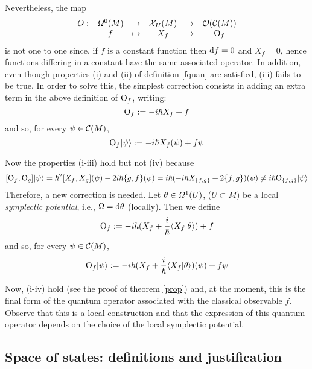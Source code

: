 \documentclass[12pt]{article}
\theoremstyle{plain}
\def\beq{\begin{equation}}
\def\eeq{\end{equation}}
\def\d{{\rm d}}
\def\C{{\cal C}}
\def\sta{|\psi \rangle }
\def\Op{{\rm O}}
\begin{document}
Nevertheless, the map
$$
\begin{array}{cccccc}
O:&{\mit\Omega}^0 (M)&\to &{\cal X}_H(M)&\to &{\cal O}(\C (M))
\\
&f& \mapsto &X_f& \mapsto &\Op_f
\end{array}
$$
is not one to one since,
if $f$ is a constant function
then $\d f = 0$ and $X_f=0$,
hence functions differing in a constant
have the same associated operator.
In addition, even though properties (i) and (ii) of definition
\ref{fquan}
are satisfied, (iii) fails to be true.
In order to solve this,
the simplest correction consists in adding
an extra term in the above definition of
$\Op_f$, writing:
$$
\Op_f := -i\hbar X_f + f
$$
and so, for every $\psi \in \C (M)$,
$$
\Op_f\sta := -i\hbar X_f(\psi) +f\psi
$$

Now the properties (i-iii) hold but not (iv) because $$
[\Op_f,\Op_g]\sta = \hbar^2 [X_f,X_g](\psi) - 2i\hbar \{ g,f\}
(\psi )= i\hbar (-i\hbar X_{\{ f,g\}} + 2\{ f,g\} )(\psi) \not=
i\hbar \Op_{\{ f,g\}}\sta $$ Therefore, a new correction is
needed. Let $\theta \in {\mit\Omega}^1(U)$, ($U\subset M)$ be a
local {\it symplectic potential}, i.e., $\Omega = \d \theta$
(locally). Then we define \beq \Op_f := -i\hbar (X_f +
\frac{i}{\hbar}\langle X_f |\theta \rangle )+f \label{oper} \eeq
and so, for every $\psi \in \C (M)$, \beq \Op_f\sta := -i\hbar
(X_f + \frac{i}{\hbar}\langle X_f |\theta \rangle ) (\psi )+f\psi
\label{opersta} \eeq

Now, (i-iv) hold (see the proof of theorem \ref{prop})
and, at the moment, this is the final form of the quantum operator
associated with the classical observable $f$.
Observe that this is a local construction
and that the expression of this quantum operator
depends on the choice of the local symplectic potential.



\subsection{Space of states: definitions and justification}
\end{document}
